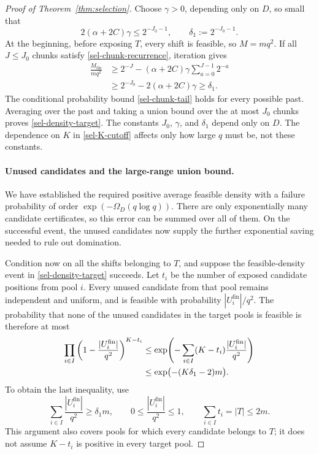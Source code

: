 \begin{proof}[Proof of Theorem~\ref{thm:selection}]
Choose $\gamma>0$, depending only on $D$, so small that
\begin{equation}\label{sel-gamma-choice}
 2(\alpha+2C)\gamma\le 2^{-J_0-1},
 \qquad
 \delta_1:=2^{-J_0-1}.
\end{equation}
At the beginning, before exposing $T$, every shift is feasible, so
$M=mq^2$.  If all $J\le J_0$ chunks satisfy
\eqref{sel-chunk-recurrence}, iteration gives
\begin{align*}
 \frac{M_{\mathrm{fin}}}{mq^2}
 &\ge 2^{-J}-(\alpha+2C)\gamma
               \sum_{a=0}^{J-1}2^{-a}\\
 &\ge 2^{-J_0}-2(\alpha+2C)\gamma
 \ge\delta_1.
\end{align*}
The conditional probability bound \eqref{sel-chunk-tail} holds for
every possible past.  Averaging over the past and taking a union bound
over the at most $J_0$ chunks proves \eqref{sel-density-target}.
The constants $J_0$, $\gamma$, and $\delta_1$ depend only on $D$.
The dependence on $K$ in \eqref{sel-K-cutoff} affects only how large
$q$ must be, not these constants.

\paragraph{Unused candidates and the large-range union bound.}
We have established the required positive average feasible density
with a failure probability of order $\exp(-\Omega_D(q\log q))$.
There are only exponentially many candidate certificates, so this
error can be summed over all of them. On the successful event, the
unused candidates now supply the further exponential saving needed
to rule out domination.

Condition now on all the shifts belonging to $T$, and suppose the
feasible-density event in \eqref{sel-density-target} succeeds.  Let
$t_i$ be the number of exposed candidate positions from pool $i$.
Every unused candidate from that pool remains independent and uniform,
and is feasible with probability $|U_i^{\mathrm{fin}}|/q^2$.
The probability that none of the unused candidates in the target pools
is feasible is therefore at most
\begin{align}
 \prod_{i\in I}
 \left(1-\frac{|U_i^{\mathrm{fin}}|}{q^2}\right)^{K-t_i}
 &\le
 \exp\!\left(-\sum_{i\in I}
       (K-t_i)\frac{|U_i^{\mathrm{fin}}|}{q^2}\right)
 \notag\\
 &\le \exp\bigl(-(K\delta_1-2)m\bigr).
 \label{sel-unused-candidates}
\end{align}
To obtain the last inequality, use
\[
 \sum_{i\in I}\frac{|U_i^{\mathrm{fin}}|}{q^2}\ge\delta_1m,
 \qquad
 0\le\frac{|U_i^{\mathrm{fin}}|}{q^2}\le1,
 \qquad
 \sum_{i\in I}t_i=|T|\le2m.
\]
This argument also covers pools for which every candidate belongs to
$T$; it does not assume $K-t_i$ is positive in every target pool.


\end{proof}
